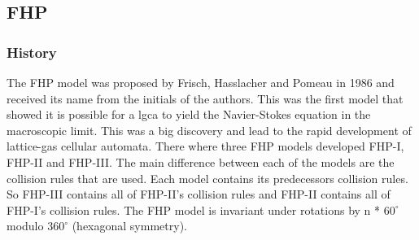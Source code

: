 \documentclass[a4paper,10pt]{article}
\begin{document}
\subsection{FHP}
\subsubsection{History}
The FHP model was proposed by Frisch, Hasslacher and Pomeau in 1986 and received its name from the initials of the authors. This was the first model that showed it is possible for a \acrshort{lgca} to yield the Navier-Stokes equation in the macroscopic limit. This was a big discovery and lead to the rapid development of lattice-gas cellular automata. There where three FHP models developed FHP-I, FHP-II and FHP-III.
The main difference between each of the models are the collision rules that are used.
Each model contains its predecessors collision rules. So FHP-III contains all of FHP-II's collision rules and FHP-II contains all of FHP-I's collision rules. 
The FHP model is invariant under rotations by n * $60^{\circ}$ modulo $360^{\circ}$ (hexagonal symmetry).
\end{document}
